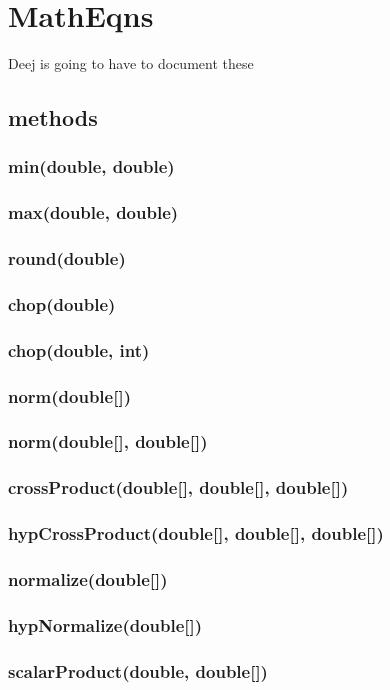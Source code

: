 \documentclass[a4paper,10pt]{report}
\begin{document}
  \section{MathEqns} Deej is going to have to document these
 \subsection{methods}
\subsubsection{min(double, double)}
\subsubsection{max(double, double)}
\subsubsection{round(double)}
\subsubsection{chop(double)}
\subsubsection{chop(double, int)}
\subsubsection{norm(double[])}
\subsubsection{norm(double[], double[])}
\subsubsection{crossProduct(double[], double[], double[])}
\subsubsection{hypCrossProduct(double[], double[], double[])}
\subsubsection{normalize(double[])}
\subsubsection{hypNormalize(double[])}
\subsubsection{scalarProduct(double, double[])}
\end{document}
